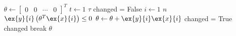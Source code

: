 \documentclass[10pt,oneside]{book}
\begin{document}
\pagestyle{empty}
\thispagestyle{empty}

\begin{codebox}
  \li $\theta \gets 
    \begin{bmatrix}
      0 & 0 & \cdots & 0
    \end{bmatrix}^T$
  \li \For $t \gets 1$ \To $\tau$
  \li   \Do
          changed = False
  \li      \For $i \gets 1$ \To $n$
  \li       \Do
              \If $\ex{y}{i}\left(\theta^T\ex{x}{i}\right) \le 0$
  \li           \Then
                  $\theta \gets \theta + \ex{y}{i}\ex{x}{i}$
  \li             changed = True
                \End
            \End
  \li      {} changed
  \li          \Then
		  break
      \End
  \li \Return $\theta$
\end{codebox}
\end{document}
